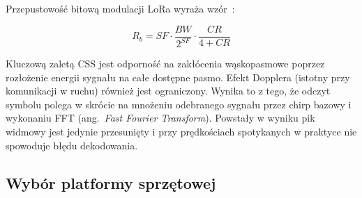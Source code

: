 Przepustowość bitową modulacji LoRa wyraża wzór~\cite{josefmtdLoraBitrate}:

\begin{equation}
    R_b = SF \cdot \frac{BW}{2^{SF}} \cdot \frac{CR}{4+CR}
    \label{eq:lora-bitrate}
\end{equation}

Kluczową zaletą CSS jest odporność na zakłócenia wąskopasmowe poprzez rozłożenie energii sygnału
na całe dostępne pasmo. Efekt Dopplera (istotny przy komunikacji w ruchu) również jest ograniczony.
Wynika to z tego, że odczyt symbolu polega w skrócie na mnożeniu odebranego sygnału przez chirp
bazowy i wykonaniu FFT (ang.\ \textit{Fast Fourier Transform}). Powstały w wyniku pik widmowy jest
jedynie przesunięty i przy prędkościach spotykanych w praktyce nie spowoduje błędu dekodowania.

\subsection*{Wybór platformy sprzętowej}

